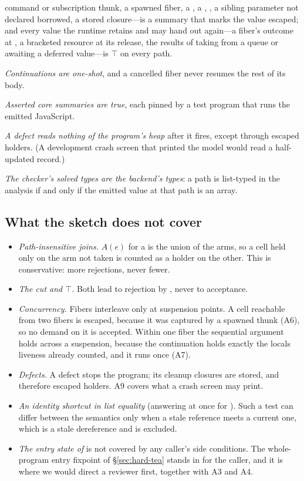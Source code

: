 \begin{description}[leftmargin=2.2em,style=sameline,font=\normalfont\bfseries]
command or subscription thunk, a spawned fiber, a , a , , a sibling
parameter not declared borrowed, a stored closure---is a summary that marks the value escaped; and every
value the runtime retains and may hand out again---a fiber's outcome at , a bracketed
resource at its release, the results of taking from a queue or awaiting a deferred value---is $\top$ on
every path.
\item[A7] \emph{Continuations are one-shot}, and a cancelled fiber never resumes the rest of its body.
\item[A8] \emph{Asserted core summaries are true}, each pinned by a test program that runs the
emitted JavaScript.
\item[A9] \emph{A defect reads nothing of the program's heap} after it fires, except through escaped
holders. (A development crash screen that printed the model would read a half-updated record.)
\item[A10] \emph{The checker's solved types are the backend's types}: a path is list-typed in the
analysis if and only if the emitted value at that path is an array.
\end{description}

\subsection{What the sketch does not cover}
\label{sec:soundness-gaps}

\begin{itemize}
\item \emph{Path-insensitive joins.} $A(e)$ for a  is the union of the arms, so a cell held
only on the arm not taken is counted as a holder on the other. This is conservative: more rejections,
never fewer.
\item \emph{The cut and $\top$.} Both lead to rejection by \Known, never to acceptance.
\item \emph{Concurrency.} Fibers interleave only at suspension points. A cell reachable from two
fibers is escaped, because it was captured by a spawned thunk (A6), so no demand on it is accepted.
Within one fiber the sequential argument holds across a suspension, because the continuation holds
exactly the locals liveness already counted, and it runs once (A7).
\item \emph{Defects.} A defect stops the program; its cleanup closures are stored, and therefore
escaped holders. A9 covers what a crash screen may print.
\item \emph{An identity shortcut in list equality} (answering  at once for
). Such a test can differ between the semantics only when a stale reference meets a
current one, which is a stale dereference and is excluded.
\item \emph{The entry state of } is not covered by any caller's side conditions. The
whole-program entry fixpoint of \S\ref{sec:hard-tea} stands in for the caller, and it is where we
would direct a reviewer first, together with A3 and A4.
\end{itemize}

